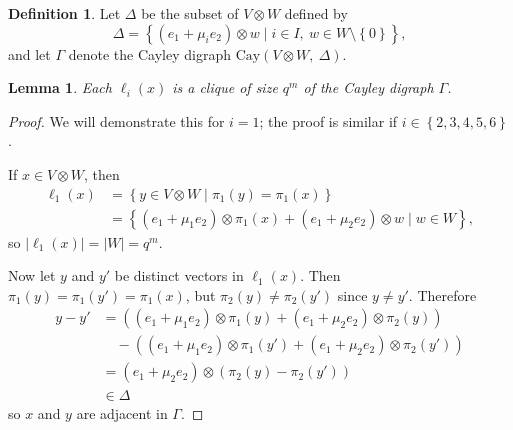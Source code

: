 \documentclass[10pt]{amsart}
\theoremstyle{definition}
\newtheorem{defi}[defi]{Definition}
\theoremstyle{plain}
\newtheorem{lemma}[lemma]{Lemma}
\theoremstyle{plain}
\theoremstyle{plain}
\theoremstyle{plain}
\newcommand{\Cay}{\mathrm{Cay}}
\begin{document}
\begin{defi} \label{def:hamming-union}
Let $\Delta$ be the subset of $V \otimes W$ defined by
\begin{displaymath}
    \Delta = {\left\{\left(e_1 + \mu_i e_2 \right) \otimes w \mid i \in I,\ w \in W \setminus \left\{0 \right\}\right\}},
\end{displaymath}
and let $\Gamma$ denote the Cayley digraph $\Cay{\left(V \otimes W,\ \Delta \right)}$.
\end{defi}

\begin{lemma} \label{lm:cliques}
Each $\ell_i{\left(x \right)}$ is a clique of size $q^m$ of the Cayley digraph $\Gamma$.
\end{lemma}
\begin{proof}
We will demonstrate this for $i = 1$; the proof is similar if $i \in \left\{2, 3, 4, 5, 6 \right\}$.

If $x \in V \otimes W$, then
\begin{align*}
    \ell_1{\left(x \right)} &= \left\{y \in V \otimes W \mid \pi_1{\left(y \right)} = \pi_1{\left(x \right)}\right\} \\
    &= {\left\{\left(e_1 + \mu_1 e_2 \right) \otimes \pi_1{\left(x \right)} + \left(e_1 + \mu_2 e_2 \right) \otimes w \mid w \in W \right\}},
\end{align*}
so $\left|\ell_1{\left(x \right)} \right| = \left|W \right| = q^m$.

Now let $y$ and $y'$ be distinct vectors in $\ell_1{\left(x \right)}$. Then $\pi_1{\left(y \right)} = \pi_1{\left(y' \right)} = \pi_1{\left(x \right)}$, but $\pi_2{\left(y \right)} \neq \pi_2{\left(y' \right)}$ since $y \neq y'$. Therefore
\begin{align*}
    y-y' &= \left(\left(e_1 + \mu_1 e_2 \right) \otimes \pi_1{\left(y \right)} + \left(e_1 + \mu_2 e_2 \right) \otimes \pi_2{\left(y \right)}\right) \\
    & \quad - \left(\left(e_1 + \mu_1 e_2 \right) \otimes \pi_1{\left(y' \right)} + \left(e_1 + \mu_2 e_2 \right) \otimes \pi_2{\left(y' \right)}\right) \\
    &= \left(e_1 + \mu_2 e_2 \right) \otimes \left(\pi_2{\left(y \right)} - \pi_2{\left(y' \right)}\right) \\
    &\in \Delta
\end{align*}
so $x$ and $y$ are adjacent in $\Gamma$.
\end{proof}
\end{document}
